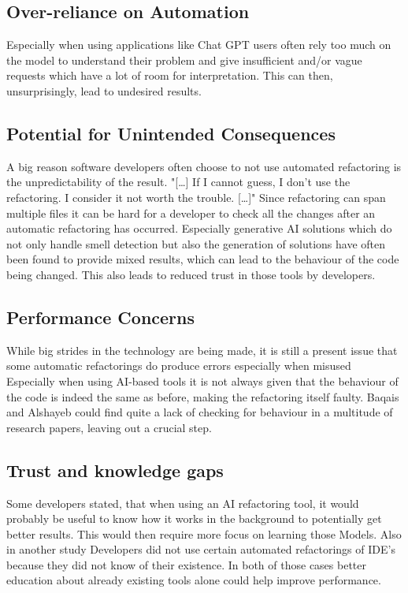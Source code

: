 \subsection{Over-reliance on Automation}
Especially when using applications like Chat GPT users often rely too much on the model to understand their problem and give insufficient and/or vague requests which have a lot of room for interpretation. This can then, unsurprisingly, lead to undesired results. \cite{alomar2024refactor}

\subsection{Potential for Unintended Consequences}
A big reason software developers often choose to not use automated refactoring is the unpredictability of the result. 
"[…] If I cannot guess, I don't use the refactoring. I consider it not worth the trouble. […]" \cite{usedisuserefactor} Since refactoring can span multiple files it can be hard for a developer to check all the changes after an automatic refactoring has occurred.
Especially generative AI solutions which do not only handle smell detection but also the generation of solutions have often been found to provide mixed results, which can lead to the behaviour of the code being changed. This also leads to reduced trust in those tools by developers. \cite{10.1145/3397481.3450656}

\subsection{Performance Concerns}
While big strides in the technology are being made, it is still a present issue that some automatic refactorings do produce errors especially when misused \cite{7833023} 
Especially when using AI-based tools it is not always given that the behaviour of the code is indeed the same as before, making the refactoring itself faulty. Baqais and Alshayeb could find quite a lack of checking for behaviour in a multitude of research papers, leaving out a crucial step. \cite{baqais2020automatic}

\subsection{Trust and knowledge gaps}
Some developers stated, that when using an AI refactoring tool, it would probably be useful to know how it works in the background to potentially get better results. \cite{10.1145/3397481.3450656}
This would then require more focus on learning those Models. Also in another study Developers did not use certain automated refactorings of IDE's because they did not know of their existence. \cite{negara2013comparative}
In both of those cases better education about already existing tools alone could help improve performance.
